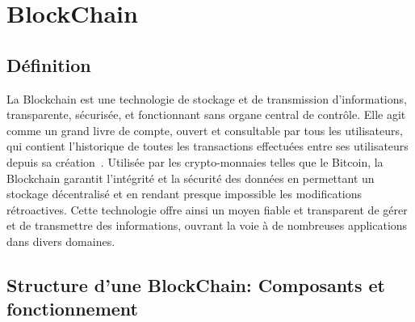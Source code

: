 \documentclass[journal, a4paper]{IEEEtran}
\begin{document}
\section{BlockChain}\label{sec:blockchain}

	\subsection{\textbf{Définition}}\label{subsec:definition}

		La Blockchain est une technologie de stockage et de transmission d'informations, transparente, sécurisée,
		et fonctionnant sans organe central de contrôle.
	Elle agit comme un grand livre de compte, ouvert et consultable par tous les utilisateurs, qui contient l'historique
		de toutes les transactions effectuées entre ses utilisateurs depuis sa création~\cite{blockchain}.
	Utilisée par les crypto-monnaies telles que le Bitcoin, la Blockchain garantit l'intégrité et la sécurité des données
	en permettant un stockage décentralisé et en rendant presque impossible les modifications rétroactives.
	Cette technologie offre ainsi un moyen fiable et transparent de gérer et de transmettre des informations,
	ouvrant la voie à de nombreuses applications dans divers domaines.

	\subsection{\textbf{Structure d'une BlockChain: Composants et fonctionnement}}\label{subsec:structure}
\end{document}
